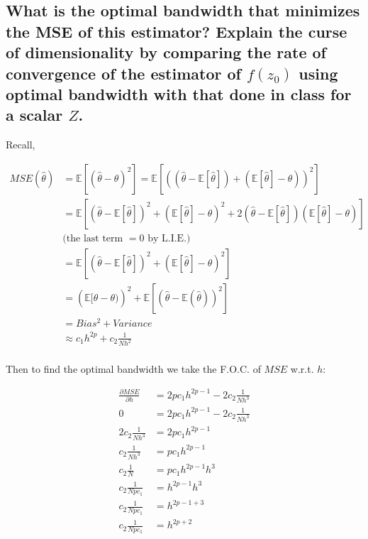 \documentclass[11pt]{article}
\theoremstyle{definition}
\begin{document}
\subsection{What is the optimal bandwidth that minimizes the MSE of this estimator? Explain the curse of dimensionality by comparing the rate of convergence of the estimator of $f(z_{0})$ using optimal bandwidth with that done in class for a scalar $Z$.}

Recall,

\begin{equation*}
\begin{split}
MSE(\hat{\theta})&=\mathbb{E}[(\hat{\theta}-\theta)^{2}] =\mathbb{E}[((\hat{\theta}-\mathbb{E}[\hat{\theta}])+(\mathbb{E}[\hat{\theta}] - \theta))^{2}] \\
&=\mathbb{E}[(\hat{\theta}-\mathbb{E}[\hat{\theta}])^{2}+(\mathbb{E}[\hat{\theta}] - \theta)^{2} + 2(\hat{\theta}-\mathbb{E}[\hat{\theta}])(\mathbb{E}[\hat{\theta}]-\theta)] \\
& \text{(the last term $=0$ by L.I.E.)} \\
&= \mathbb{E}[(\hat{\theta}-\mathbb{E}[\hat{\theta}])^{2}+(\mathbb{E}[\hat{\theta}] - \theta)^{2}] \\
& =\left(\mathbb{E}[\hat{\theta}-\theta)\right)^{2} + \mathbb{E}\left[(\hat{\theta}-\mathbb{E}(\hat{\theta}))^{2}\right]\\
&= Bias^{2} + Variance\\
&\approx c_{1}h^{2p}+ c_{2}\frac{1}{Nh^{2}}\\
\end{split}
\end{equation*}

Then to find the optimal bandwidth we take the F.O.C. of $MSE$ w.r.t. $h$:

\begin{equation*}
\begin{split}
\frac{\partial MSE}{\partial h} &=2pc_{1}h^{2p-1}-2c_{2}\frac{1}{Nh^{3}} \\
0 & = 2pc_{1}h^{2p-1}-2c_{2}\frac{1}{Nh^{3}} \\
2c_{2}\frac{1}{Nh^{3}} &= 2pc_{1}h^{2p-1}\\
c_{2}\frac{1}{Nh^{3}} &= pc_{1}h^{2p-1}\\
c_{2}\frac{1}{N} &= pc_{1}h^{2p-1}h^{3}\\
c_{2}\frac{1}{Npc_{1}} &= h^{2p-1}h^{3}\\
c_{2}\frac{1}{Npc_{1}} &= h^{2p-1+3}\\
c_{2}\frac{1}{Npc_{1}} &= h^{2p+2}\\
\end{split}
\end{equation*}
\end{document}
